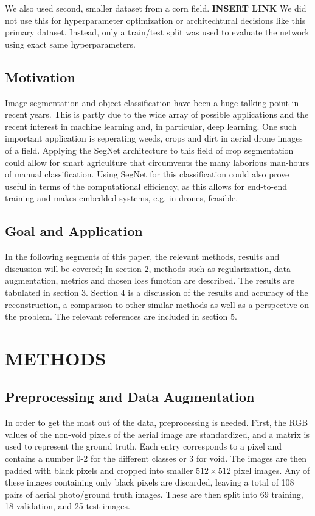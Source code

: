 \documentclass{article}
\begin{document}
We also used second, smaller dataset from a corn field. \textbf{INSERT LINK}
We did not use this for hyperparameter optimization or architechtural decisions like this primary dataset.
Instead, only a train/test split was used to evaluate the network using exact same hyperparameters.

\subsection{Motivation}
Image segmentation and object classification have been a huge talking point in recent years. This is partly due to the wide array of possible applications and the recent interest in machine learning and, in particular, deep learning. One such important application is seperating weeds, crops and dirt in aerial drone images of a field. Applying the SegNet architecture to this field of crop segmentation could allow for smart agriculture that circumvents the many laborious man-hours of manual classification. Using SegNet for this classification could also prove useful in terms of the computational efficiency, as this allows for end-to-end training and makes embedded systems, e.g. in drones, feasible.

\subsection{Goal and Application}


In the following segments of this paper, the relevant methods, results and discussion will be covered; In section 2, methods such as regularization, data augmentation, metrics and chosen loss function are described. The results are tabulated in section 3. Section 4 is a discussion of the results and accuracy of the reconstruction, a comparison to other similar methods as well as a perspective on the problem. The relevant references are included in section 5.

\section{METHODS}
\label{sec:format}

\subsection{Preprocessing and Data Augmentation}
In order to get the most out of the data, preprocessing is needed.
First, the RGB values of the non-void pixels of the aerial image are standardized, and a matrix is used to represent the ground truth.
Each entry corresponds to a pixel and contains a number 0-2 for the different classes or 3 for void.
The images are then padded with black pixels and cropped into smaller $ 512\times 512 $ pixel images.
Any of these images containing only black pixels are discarded, leaving a total of 108 pairs of aerial photo/ground truth images.
These are then split into 69 training, 18 validation, and 25 test images.
\end{document}
